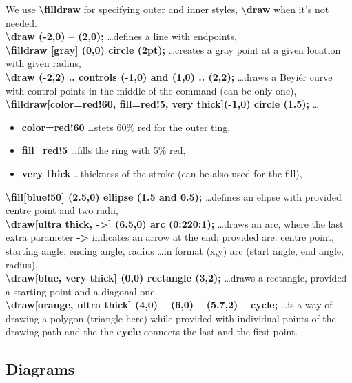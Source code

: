 \documentclass[11pt, a4paper]{article}
\begin{document}
		\noindent
		We use \textbf{\textbackslash filldraw} for specifying outer and inner styles, \textbf{\textbackslash draw} when it's not needed.\\[3mm]
		\textbf{\textbackslash draw (-2,0) -- (2,0);} \dots defines a line with endpoints,\\
		\textbf{\textbackslash filldraw [gray] (0,0) circle (2pt);} \dots creates a gray point at a given location with given radius,\\
		\textbf{\textbackslash draw (-2,2) .. controls (-1,0) and (1,0) .. (2,2);} \dots draws a Beyiér curve with control points in the middle of the command (can be only one),\\
		\textbf{\textbackslash filldraw[color=red!60, fill=red!5, very thick](-1,0) circle (1.5);} \dots
		\begin{itemize}
			\item \textbf{color=red!60} \dots stets 60\% red for the outer ting,
			\item \textbf{fill=red!5} \dots fills the ring with 5\% red,
			\item \textbf{very thick} \dots thickness of the stroke (can be also used for the fill),
		\end{itemize}
		\textbf{\textbackslash fill[blue!50] (2.5,0) ellipse (1.5 and 0.5);} \dots defines an elipse with provided centre point and two radii,\\
		\textbf{\textbackslash draw[ultra thick, ->] (6.5,0) arc (0:220:1);} \dots draws an arc, where the last extra parameter \textbf{->} indicates an arrow at the end; provided are: centre point, starting angle, ending angle, radius \dots in format (x,y) arc (start angle, end angle, radius),\\
		\textbf{\textbackslash draw[blue, very thick] (0,0) rectangle (3,2);} \dots draws a rectangle, provided a starting point and a diagonal one,\\
		\textbf{\textbackslash draw[orange, ultra thick] (4,0) -- (6,0) -- (5.7,2) -- cycle;} \dots is a way of drawing a polygon (triangle here) while provided with individual points of the drawing path and the the \textbf{cycle} connects the last and the first point.
		
	\subsection*{Diagrams}
		
\end{document}
